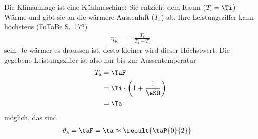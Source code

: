 Die Klimaanlage ist eine Kühlmaschine: Sie entzieht dem Raum ($T_\text{i} = \Ti$) Wärme und gibt sie an die wärmere Aussenluft ($T_\text{a}$) ab. Ihre Leistungsziffer kann höchstens (FoTaBe S.~172)
\begin{align}
 \eta_\text{K} &= \frac{T_\text{i}}{T_\text{a}-T_\text{i}}
\end{align}
sein. Je wärmer es draussen ist, desto kleiner wird dieser Höchstwert. Die gegebene Leistungsziffer ist also nur bis zur Aussentemperatur
\begin{align}
 T_\text{a} &= \TaF \\
   &= \Ti\cdot\left(1+\frac{1}{\eKO}\right) \\
   &= \Ta
\end{align}
möglich, das sind
\begin{align}
 \vartheta_\text{a} &= \taF = \ta \approx \result{\taP{0}{2}}
\end{align}
